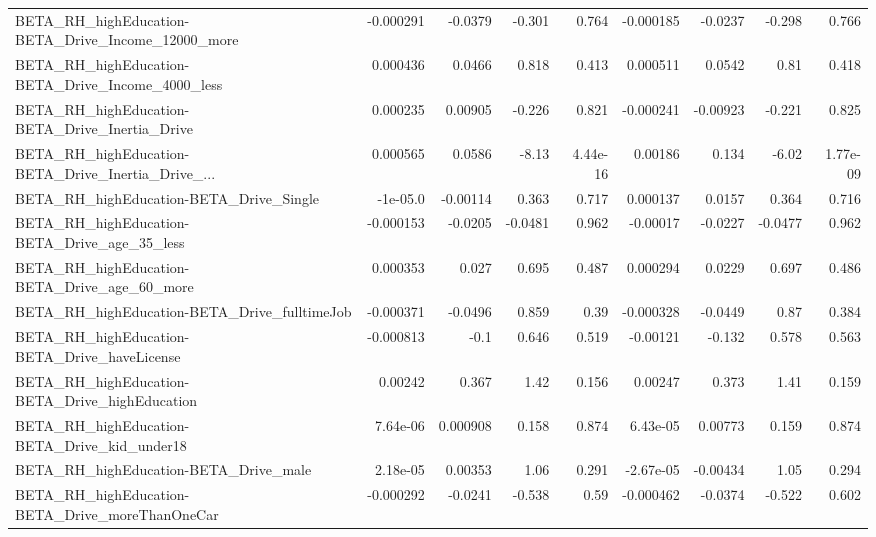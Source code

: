 \begin{tabular}{lrrrrrrrr}
BETA\_RH\_highEducation-BETA\_Drive\_Income\_12000\_more &   -0.000291 &      -0.0379 &   -0.301 &    0.764 &  -0.000185 &     -0.0237 &       -0.298 &         0.766 \\
BETA\_RH\_highEducation-BETA\_Drive\_Income\_4000\_less  &    0.000436 &       0.0466 &    0.818 &    0.413 &   0.000511 &      0.0542 &         0.81 &         0.418 \\
BETA\_RH\_highEducation-BETA\_Drive\_Inertia\_Drive     &    0.000235 &      0.00905 &   -0.226 &    0.821 &  -0.000241 &    -0.00923 &       -0.221 &         0.825 \\
BETA\_RH\_highEducation-BETA\_Drive\_Inertia\_Drive\_... &    0.000565 &       0.0586 &    -8.13 & 4.44e-16 &    0.00186 &       0.134 &        -6.02 &      1.77e-09 \\
BETA\_RH\_highEducation-BETA\_Drive\_Single            &    -1e-05.0 &     -0.00114 &    0.363 &    0.717 &   0.000137 &      0.0157 &        0.364 &         0.716 \\
BETA\_RH\_highEducation-BETA\_Drive\_age\_35\_less       &   -0.000153 &      -0.0205 &  -0.0481 &    0.962 &   -0.00017 &     -0.0227 &      -0.0477 &         0.962 \\
BETA\_RH\_highEducation-BETA\_Drive\_age\_60\_more       &    0.000353 &        0.027 &    0.695 &    0.487 &   0.000294 &      0.0229 &        0.697 &         0.486 \\
BETA\_RH\_highEducation-BETA\_Drive\_fulltimeJob       &   -0.000371 &      -0.0496 &    0.859 &     0.39 &  -0.000328 &     -0.0449 &         0.87 &         0.384 \\
BETA\_RH\_highEducation-BETA\_Drive\_haveLicense       &   -0.000813 &         -0.1 &    0.646 &    0.519 &   -0.00121 &      -0.132 &        0.578 &         0.563 \\
BETA\_RH\_highEducation-BETA\_Drive\_highEducation     &     0.00242 &        0.367 &     1.42 &    0.156 &    0.00247 &       0.373 &         1.41 &         0.159 \\
BETA\_RH\_highEducation-BETA\_Drive\_kid\_under18       &    7.64e-06 &     0.000908 &    0.158 &    0.874 &   6.43e-05 &     0.00773 &        0.159 &         0.874 \\
BETA\_RH\_highEducation-BETA\_Drive\_male              &    2.18e-05 &      0.00353 &     1.06 &    0.291 &  -2.67e-05 &    -0.00434 &         1.05 &         0.294 \\
BETA\_RH\_highEducation-BETA\_Drive\_moreThanOneCar    &   -0.000292 &      -0.0241 &   -0.538 &     0.59 &  -0.000462 &     -0.0374 &       -0.522 &         0.602 \\

\end{tabular}
